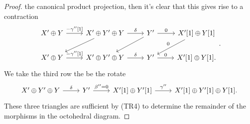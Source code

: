 \documentclass[dissertation.tex]{subfiles}
\begin{document}
\begin{prop}
\begin{proof}
  the canonical product projection, then it's clear that
  this gives rise to a contraction
    $$\begin{tikzcd}
      X^\prime \oplus Y \arrow{r}{-\gamma^{\prime\prime}[1]} & X^\prime \oplus Y^\prime \oplus Y \arrow{r}{\delta}\arrow[swap]{ld} & Y^\prime \arrow[swap]{ld}\arrow{r}{0} & X^\prime[1] \oplus Y[1]\arrow[swap]{ld}{0}\\
      X^\prime \oplus Y \arrow{r}{-\gamma^{\prime\prime}[1]} & X^\prime \oplus Y^\prime \oplus Y \arrow{r}{\delta} & Y^\prime \arrow{r}{0} & X^\prime[1] \oplus Y[1].
    \end{tikzcd}.$$
  We take the third row the be the rotate
  $$\begin{tikzcd}
      X^\prime \oplus Y^\prime \oplus Y \arrow{r}{\delta} & Y^\prime \arrow{r}{\beta^{\prime\prime}=0} & X^\prime[1] \oplus Y^\prime[1] \arrow{r}{\gamma^{\prime\prime}} & X^\prime[1] \oplus Y^\prime[1] \oplus Y[1].
  \end{tikzcd}$$
  These three triangles are sufficient by (TR4) to determine the remainder of the morphisms in the octohedral diagram.
  

\end{proof}
\end{prop}
\end{document}
